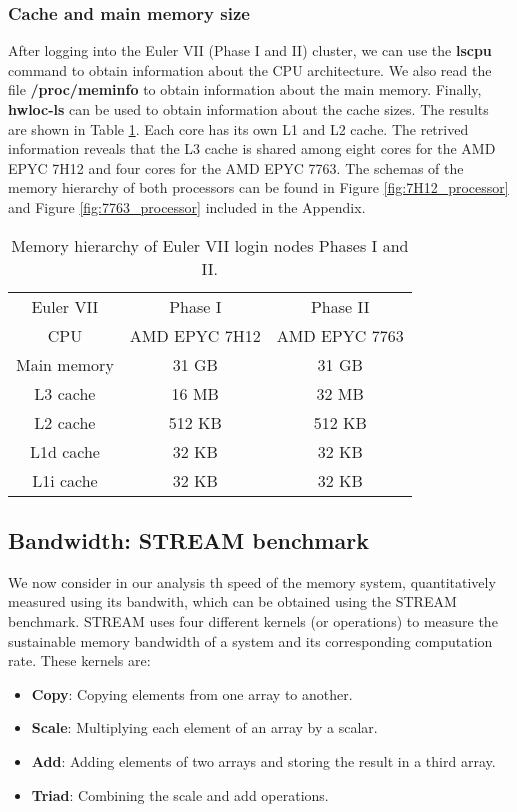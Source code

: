\documentclass[unicode,11pt,a4paper,oneside,numbers=endperiod,openany]{scrartcl}
\begin{document}
\subsubsection{Cache and main memory size}
After logging into the Euler VII (Phase I and II) cluster, we can use the \textbf{lscpu} command to obtain information
about the CPU architecture. We also read the file \textbf{/proc/meminfo} to obtain information about the main memory.
Finally, \textbf{hwloc-ls} can be used to obtain information about the cache sizes. The results are shown in Table \ref{tab:memory-config}.
Each core has its own L1 and L2 cache. The retrived information reveals that the L3 cache is shared among eight 
cores for the AMD EPYC 7H12 and four cores for the AMD EPYC 7763. 
The schemas of the memory hierarchy of both processors can be found in 
Figure \ref{fig:7H12_processor} and Figure \ref{fig:7763_processor} included in the Appendix.


\begin{table}[h]
    \centering
    \caption{Memory hierarchy of Euler VII login nodes Phases I and II.}
    \begin{tabular}{||c c c||} 
     \hline
    Euler VII & Phase I & Phase II \\ [0.5ex] 
    CPU & AMD EPYC 7H12 & AMD EPYC 7763 \\
    \hline\hline
     Main memory & 31 GB & 31 GB \\ 
     \hline
     L3 cache & 16 MB & 32 MB \\
     \hline
     L2 cache & 512 KB & 512 KB \\
     \hline
     L1d cache & 32 KB & 32 KB \\
     \hline
     L1i cache & 32 KB & 32 KB \\
     \hline
    \end{tabular}
    \label{tab:memory-config}
\end{table}


\subsection{Bandwidth: STREAM benchmark}\label{sec:STREAM_benchmark}
We now consider in our analysis th speed of the memory system, quantitatively measured using its 
bandwith, which can be obtained using the STREAM benchmark. STREAM uses four different kernels (or 
operations) to measure the sustainable memory bandwidth of a system and its corresponding
computation rate. These kernels are:
\begin{itemize}
    \item \textbf{Copy}: Copying elements from one array to another.
    \item \textbf{Scale}: Multiplying each element of an array by a scalar.
    \item \textbf{Add}: Adding elements of two arrays and storing the result in a third array.
    \item \textbf{Triad}: Combining the scale and add operations.
\end{itemize}
\end{document}
